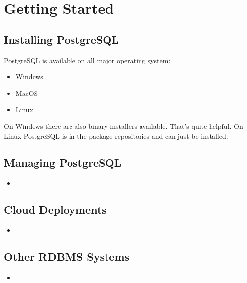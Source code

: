 %
%
%
\section{Getting Started}

\subsection{Installing PostgreSQL}
PostgreSQL is available on all major operating system:

\begin{itemize}
    \item Windows
    \item MacOS
    \item Linux
\end{itemize}

On Windows there are also binary installers available. That's quite helpful. 
On Linux PostgreSQL is in the package repositories and can just be installed.

\subsection{Managing PostgreSQL}

\begin{itemize}
    \item 
\end{itemize}


\subsection{Cloud Deployments}

\begin{itemize}
    \item 
\end{itemize}

\subsection{Other RDBMS Systems}

\begin{itemize}
    \item 
\end{itemize}
